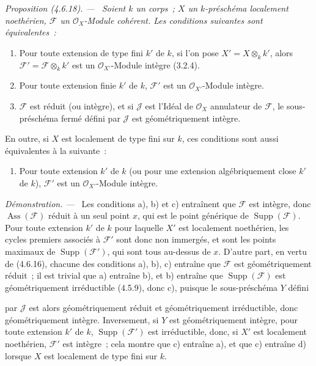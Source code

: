 \documentclass[10pt,oneside]{book}
\newcommand{\oldpage}[2][]{%
  \setcounter{footnote}{0}%
  \marginpar{\scriptsize\textbf{#1}~|~#2}\ignorespaces}
\newenvironment{proposition}[1][]{%
  \par\medskip\noindent\itshape Proposition (#1). ---\ }{\par}
\newenvironment{proof}{%
  \par\medskip\noindent\textit{Démonstration. ---\ }}{\par}
\begin{document}
\begin{proposition}[4.6.18]
\label{IV.2.4.6.18-fr}
Soient $k$ un corps~; $X$ un $k$-préschéma localement noethérien, $\mathscr F$
un $\mathcal O_X$-Module cohérent. Les conditions suivantes sont
équivalentes~:
\begin{enumerate}
\item[a)] Pour toute extension de type fini $k'$ de $k$, si l'on pose
$X'=X\otimes_k k'$, alors $\mathscr F'=\mathscr F\otimes_k k'$ est un
$\mathcal O_{X'}$-Module intègre (3.2.4).
\item[b)] Pour toute extension finie $k'$ de $k$, $\mathscr F'$ est un
$\mathcal O_{X'}$-Module intègre.
\item[c)] $\mathscr F$ est réduit (ou intègre), et si $\mathscr J$ est
l'Idéal de $\mathcal O_X$ annulateur de $\mathscr F$, le sous-préschéma fermé
défini par $\mathscr J$ est géométriquement intègre.
\end{enumerate}
En outre, si $X$ est localement de type fini sur $k$, ces conditions sont aussi
équivalentes à la suivante~:
\begin{enumerate}
\item[d)] Pour toute extension $k'$ de $k$ (ou pour une extension
algébriquement close $k'$ de $k$), $\mathscr F'$ est un
$\mathcal O_{X'}$-Module intègre.
\end{enumerate}
\end{proposition}

\begin{proof}
Les conditions a), b) et c) entraînent que $\mathscr F$ est intègre, donc
$\operatorname{Ass}(\mathscr F)$ réduit à un seul point $x$, qui est le point
générique de $\operatorname{Supp}(\mathscr F)$. Pour toute extension $k'$ de
$k$ pour laquelle $X'$ est localement noethérien, les cycles premiers associés
à $\mathscr F'$ sont donc non immergés, et sont les points maximaux de
$\operatorname{Supp}(\mathscr F')$, qui sont tous au-dessus de $x$. D'autre
part, en vertu de (4.6.16), chacune des conditions a), b), c) entraîne que
$\mathscr F$ est géométriquement réduit~; il est trivial que a) entraîne b),
et b) entraîne que $\operatorname{Supp}(\mathscr F)$ est géométriquement
irréductible (4.5.9), donc c), puisque le sous-préschéma $Y$ défini

\oldpage[IV-2]{74}

par $\mathscr J$ est alors géométriquement réduit et géométriquement
irréductible, donc géométriquement intègre. Inversement, si $Y$ est
géométriquement intègre, pour toute extension $k'$ de $k$,
$\operatorname{Supp}(\mathscr F')$ est irréductible, donc, si $X'$ est
localement noethérien, $\mathscr F'$ est intègre~; cela montre que c) entraîne
a), et que c) entraîne d) lorsque $X$ est localement de type fini sur $k$.
\end{proof}
\end{document}
